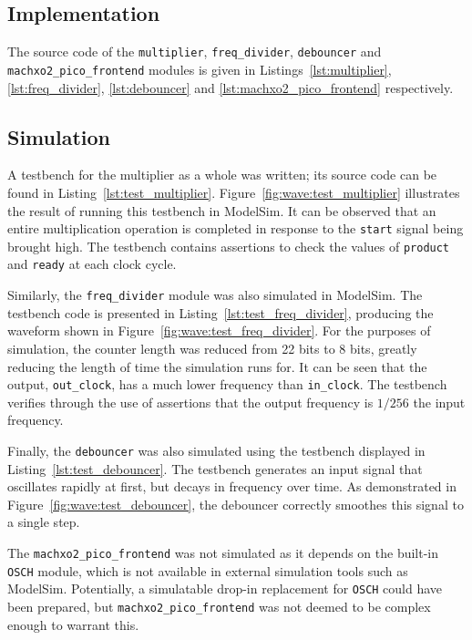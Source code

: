 \documentclass[a4paper]{article}
\begin{document}
\subsection{Implementation}
\label{sec:mult:impl}

The source code of the \texttt{multiplier}, \texttt{freq\_divider}, \texttt{debouncer} and \texttt{machxo2\_pico\_frontend} modules is given in Listings~\ref{lst:multiplier}, \ref{lst:freq_divider}, \ref{lst:debouncer} and \ref{lst:machxo2_pico_frontend} respectively.

\subsection{Simulation}
\label{sec:mult:sim}

A testbench for the multiplier as a whole was written; its source code can be found in Listing~\ref{lst:test_multiplier}. Figure~\ref{fig:wave:test_multiplier} illustrates the result of running this testbench in ModelSim. It can be observed that an entire multiplication operation is completed in response to the \texttt{start} signal being brought high. The testbench contains assertions to check the values of \texttt{product} and \texttt{ready} at each clock cycle.

Similarly, the \texttt{freq\_divider} module was also simulated in ModelSim. The testbench code is presented in Listing~\ref{lst:test_freq_divider}, producing the waveform shown in Figure~\ref{fig:wave:test_freq_divider}. For the purposes of simulation, the counter length was reduced from 22 bits to 8 bits, greatly reducing the length of time the simulation runs for. It can be seen that the output, \texttt{out\_clock}, has a much lower frequency than \texttt{in\_clock}. The testbench verifies through the use of assertions that the output frequency is $1/256$ the input frequency.

Finally, the \texttt{debouncer} was also simulated using the testbench displayed in Listing~\ref{lst:test_debouncer}. The testbench generates an input signal that oscillates rapidly at first, but decays in frequency over time. As demonstrated in Figure~\ref{fig:wave:test_debouncer}, the debouncer correctly smoothes this signal to a single step.

The \texttt{machxo2\_pico\_frontend} was not simulated as it depends on the built-in \texttt{OSCH} module, which is not available in external simulation tools such as ModelSim. Potentially, a simulatable drop-in replacement for \texttt{OSCH} could have been prepared, but \texttt{machxo2\_pico\_frontend} was not deemed to be complex enough to warrant this.
\end{document}
